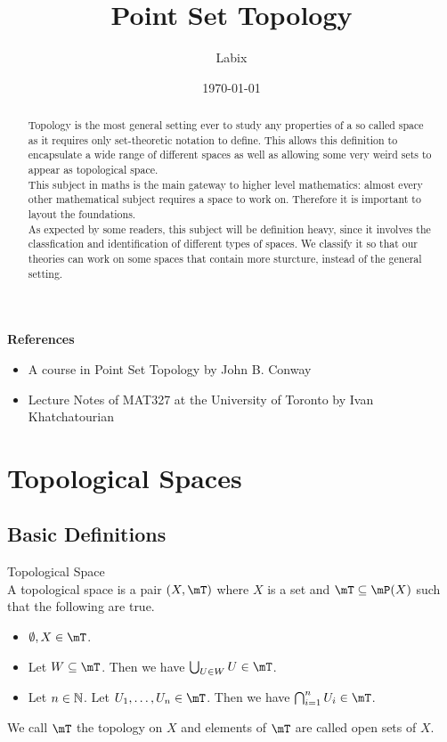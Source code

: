\documentclass[a4paper]{article}
\title{Point Set Topology}
\author{Labix}
\date{\today}
\begin{document}
\maketitle
\begin{abstract}
Topology is the most general setting ever to study any properties of a so called space as it requires only set-theoretic notation to define. This allows this definition to encapsulate a wide range of different spaces as well as allowing some very weird sets to appear as topological space. \\
This subject in maths is the main gateway to higher level mathematics: almost every other mathematical subject requires a space to work on. Therefore it is important to layout the foundations. \\
As expected by some readers, this subject will be definition heavy, since it involves the classfication and identification of different types of spaces. We classify it so that our theories can work on some spaces that contain more sturcture, instead of the general setting. 
\end{abstract}
\textbf{References}
\begin{itemize}
\item A course in Point Set Topology by John B. Conway
\item Lecture Notes of MAT327 at the University of Toronto by Ivan Khatchatourian
\end{itemize}
\pagebreak
\tableofcontents
\pagebreak
\section{Topological Spaces}
\subsection{Basic Definitions}
\begin{defn}{Topological Space}{}\\
A topological space is a pair $(X,\mT)$ where $X$ is a set and $\mT\subseteq\mP(X)$ such that the following are true. 
\begin{itemize}
\item $\emptyset,X\in\mT$. 
\item Let $W\subseteq\mT$. Then we have $\bigcup_{U\in W}U\in\mT$. 
\item Let $n\in\mathbb{N}$. Let $U_1,\dots,U_n\in\mT$. Then we have $\bigcap_{i=1}^nU_i\in\mT$. 
\end{itemize}
We call $\mT$ the topology on $X$ and elements of $\mT$ are called open sets of $X$. 
\end{defn}
\end{document}
